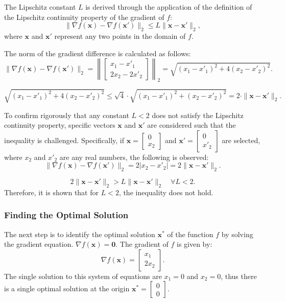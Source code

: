 \documentclass[11pt]{article}
\begin{document}
The Lipschitz constant \( L \) is derived through the application of the definition of the Lipschitz continuity property of the gradient of \( f \):
\[
\| \nabla f(\mathbf{x}) - \nabla f(\mathbf{x'}) \|_2 \leq L \| \mathbf{x} - \mathbf{x'} \|_2,
\]
where \( \mathbf{x} \) and \( \mathbf{x'} \) represent any two points in the domain of \( f \). 

The norm of the gradient difference is calculated as follows:
\[
\| \nabla f(\mathbf{x}) - \nabla f(\mathbf{x'}) \|_2 = \left\| \begin{bmatrix} x_1 - x'_1 \\ 2x_2 - 2x'_2 \end{bmatrix} \right\|_2 = \sqrt{(x_1 - x'_1)^2 + 4(x_2 - x'_2)^2}.
\]

\[
\sqrt{(x_1 - x'_1)^2 + 4(x_2 - x'_2)^2} \leq \sqrt{4} \cdot \sqrt{(x_1 - x'_1)^2 + (x_2 - x'_2)^2} = 2 \cdot \|\mathbf{x} - \mathbf{x'}\|_2.
\]

To confirm rigorously that any constant \( L < 2 \) does not satisfy the Lipschitz continuity property, specific vectors \( \mathbf{x} \) and \( \mathbf{x'} \) are considered such that the inequality is challenged. Specifically, if \( \mathbf{x} = \begin{bmatrix} 0 \\ x_2 \end{bmatrix} \) and \( \mathbf{x'} = \begin{bmatrix} 0 \\ x'_2 \end{bmatrix} \) are selected, where \( x_2 \) and \( x'_2 \) are any real numbers, the following is observed:
\[
\| \nabla f(\mathbf{x}) - \nabla f(\mathbf{x'}) \|_2 = 2 |x_2 - x'_2| = 2 \|\mathbf{x} - \mathbf{x'}\|_2.
\]

\[
2 \|\mathbf{x} - \mathbf{x'}\|_2 > L \|\mathbf{x} - \mathbf{x'}\|_2 \quad \forall L < 2.
\]
Therefore, it is shown that for \( L < 2 \), the inequality does not hold.

\subsubsection{Finding the Optimal Solution}
The next step is to identify the optimal solution \( \mathbf{x}^* \) of the function \( f \) by solving the gradient equation. \( \nabla f(\mathbf{x}) = \mathbf{0} \). The gradient of \( f \) is given by:
\[
\nabla f(\mathbf{x}) = \begin{bmatrix} x_1 \\ 2x_2 \end{bmatrix}.
\]
The single solution to this system of equations are \( x_1 = 0 \) and \( x_2 = 0 \), thus there is a single optimal solution at the origin \( \mathbf{x}^* = \begin{bmatrix} 0 \\ 0 \end{bmatrix} \).
\end{document}
